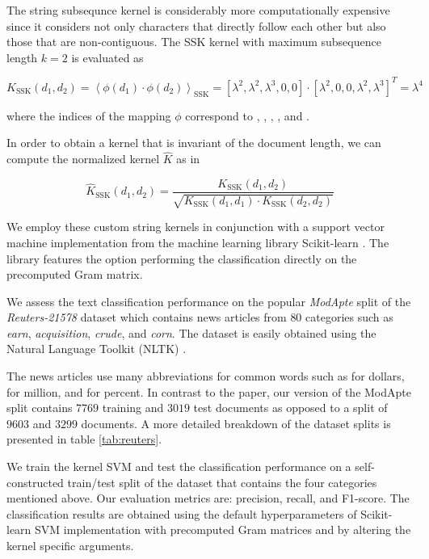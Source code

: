 
The string subsequnce kernel is considerably more computationally expensive since it considers not only characters that directly follow each other but also those that are non-contiguous. The SSK kernel with maximum subsequence length $k = 2$ is evaluated as

\begin{equation} \label{eq:ssk}
  K_\text{SSK}(d_1, d_2) = \left\langle \phi(d_1) \cdot \phi(d_2) \right\rangle_\text{SSK} = [\lambda^2, \lambda^2, \lambda^3, 0, 0] \cdot [\lambda^2, 0, 0, \lambda^2, \lambda^3]^T = \lambda^4
\end{equation}

where the indices of the mapping $\phi$ correspond to , , , , and .

In order to obtain a kernel that is invariant of the document length, we can compute the normalized kernel $\hat{K}$ as in

\begin{equation}
  \hat{K}_\text{SSK}(d_1, d_2) = \frac{K_\text{SSK}(d_1, d_2)}{\sqrt{K_\text{SSK}(d_1, d_1) \cdot K_\text{SSK}(d_2, d_2)}}
\end{equation}



We employ these custom string kernels in conjunction with a support vector machine implementation from the machine learning library Scikit-learn \cite{sklearn}. The library features the option performing the classification directly on the precomputed Gram matrix.

We assess the text classification performance on the popular \textit{ModApte} split of the \textit{Reuters-21578} dataset which contains news articles from $80$ categories such as \textit{earn}, \textit{acquisition}, \textit{crude}, and \textit{corn}. The dataset is easily obtained using the Natural Language Toolkit (NLTK) \cite{nltk}.

The news articles use many abbreviations for common words such as  for dollars,  for million, and  for percent. In contrast to the paper, our version of the ModApte split contains $7769$ training and $3019$ test documents as opposed to a split of $9603$ and $3299$ documents. A more detailed breakdown of the dataset splits is presented in table \ref{tab:reuters}.



We train the kernel SVM and test the classification performance on a self-constructed train/test split of the dataset that contains the four categories mentioned above. Our evaluation metrics are: precision, recall, and F1-score. The classification results are obtained using the default hyperparameters of Scikit-learn SVM implementation with precomputed Gram matrices and by altering the kernel specific arguments.

